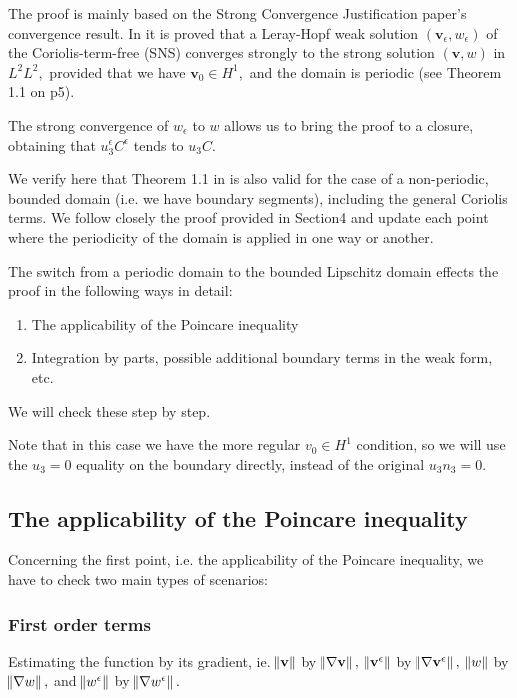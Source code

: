 \documentclass[11pt]{article}
\begin{document}
The proof is mainly based on the Strong Convergence Justification paper's convergence result. In \cite{li2019primitive} it is proved that a Leray-Hopf weak solution $(\mathbf{v}_\epsilon, w_\epsilon)$ of the Coriolis-term-free (SNS) converges strongly to the strong solution $(\mathbf{v}, w)$ in $L^2 L^2,$ provided that we have $\mathbf{v}_0 \in H^1,$ and the domain is periodic (see Theorem 1.1 on p5).

The strong convergence of $w_\epsilon$ to $w$ allows us to bring the proof to a closure, obtaining that $u_3^\epsilon C^\epsilon$ tends to $u_3 C.$

We verify here that Theorem 1.1 in \cite{li2019primitive} is also valid for the case of a non-periodic, bounded domain (i.e. we have boundary segments), including the general Coriolis terms. We follow closely the proof provided in Section4 and update each point where the periodicity of the domain is applied in one way or another.

The switch from a periodic domain to the bounded Lipschitz domain effects the proof in the following ways in detail:

\begin{enumerate}[label=\roman*)]
  \item The applicability of the Poincare inequality
  \item Integration by parts, possible additional boundary terms in the weak form, etc.
\end{enumerate}

We will check these step by step.

Note that in this case we have the more regular $v_0 \in H^1$ condition, so we will use the $u_3 = 0$ equality on the boundary directly, instead of the original $u_3 n_3 = 0.$

\subsection{The applicability of the Poincare inequality}

Concerning the first point, i.e. the applicability of the Poincare inequality, we have to check two main types of scenarios:

\subsubsection{First order terms}
  Estimating the function by its gradient, ie. $\norm{\mathbf{v}}$ by $\norm{\nabla \mathbf{v}}, $ $\norm{\mathbf{v}^\epsilon}$ by $\norm{\nabla \mathbf{v}^\epsilon}, $ $\norm{w}$ by $\norm{\nabla w}, $ and $\norm{w^\epsilon}$ by $\norm{\nabla w^\epsilon}. $
  
\end{document}
